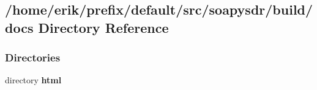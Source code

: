 \subsection{/home/erik/prefix/default/src/soapysdr/build/docs Directory Reference}
\label{dir_ff580755932bc476dde11449c0e57cdb}
\subsubsection*{Directories}
\begin{DoxyCompactItemize}
\item 
directory {\bf html}
\end{DoxyCompactItemize}
